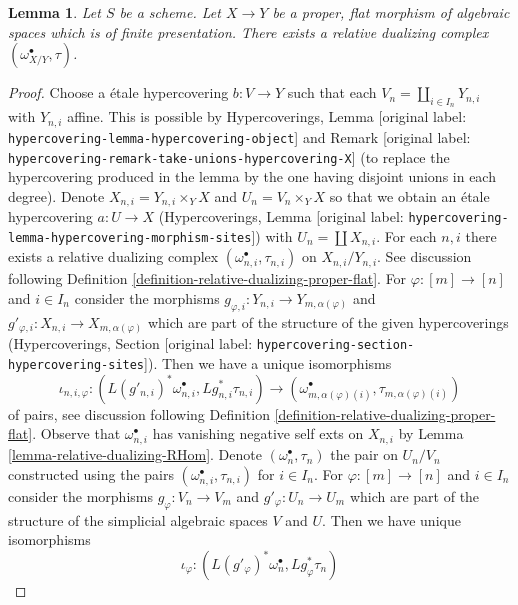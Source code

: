 \documentclass[10pt,a4paper]{article}
\theoremstyle{plain}
\newtheorem{lemma}[subsection]{Lemma}
\theoremstyle{definition}
\theoremstyle{remark}
\numberwithin{equation}{subsection}
\begin{document}
\begin{lemma}
\label{lemma-existence-relative-dualizing}
Let $S$ be a scheme. Let $X \to Y$ be a proper, flat morphism of
algebraic spaces which is of finite presentation.
There exists a relative dualizing complex $(\omega_{X/Y}^\bullet, \tau)$.
\end{lemma}

\begin{proof}
Choose a \'etale hypercovering $b : V \to Y$ such that each
$V_n = \coprod_{i \in I_n} Y_{n, i}$ with $Y_{n, i}$ affine.
This is possible by Hypercoverings, Lemma
\textnormal{[original label: \nolinkurl{hypercovering-lemma-hypercovering-object}]} and
Remark \textnormal{[original label: \nolinkurl{hypercovering-remark-take-unions-hypercovering-X}]}
(to replace the hypercovering produced
in the lemma by the one having disjoint unions in each degree).
Denote $X_{n, i} = Y_{n, i} \times_Y X$ and $U_n = V_n \times_Y X$
so that we obtain an \'etale hypercovering
$a : U \to X$ (Hypercoverings, Lemma
\textnormal{[original label: \nolinkurl{hypercovering-lemma-hypercovering-morphism-sites}]})
with $U_n = \coprod X_{n, i}$.
For each $n, i$ there exists a relative dualizing complex
$(\omega_{n, i}^\bullet, \tau_{n, i})$ on $X_{n, i}/Y_{n, i}$.
See discussion following
Definition \ref{definition-relative-dualizing-proper-flat}.
For $\varphi : [m] \to [n]$ and $i \in I_n$ consider the morphisms
$g_{\varphi, i} : Y_{n, i} \to Y_{m, \alpha(\varphi)}$ and
$g'_{\varphi, i} : X_{n, i} \to X_{m, \alpha(\varphi)}$
which are part of the structure of the given hypercoverings
(Hypercoverings, Section \textnormal{[original label: \nolinkurl{hypercovering-section-hypercovering-sites}]}).
Then we have a unique isomorphisms
$$
\iota_{n, i, \varphi} :
(L(g'_{n, i})^*\omega_{n, i}^\bullet, Lg_{n, i}^*\tau_{n, i})
\longrightarrow
(\omega_{m, \alpha(\varphi)(i)}^\bullet, \tau_{m, \alpha(\varphi)(i)})
$$
of pairs, see discussion following
Definition \ref{definition-relative-dualizing-proper-flat}.
Observe that $\omega_{n, i}^\bullet$ has vanishing negative
self exts on $X_{n, i}$ by Lemma \ref{lemma-relative-dualizing-RHom}.
Denote $(\omega_n^\bullet, \tau_n)$ the pair on $U_n/V_n$ constructed using
the pairs $(\omega_{n, i}^\bullet, \tau_{n, i})$ for $i \in I_n$.
For $\varphi : [m] \to [n]$ and $i \in I_n$ consider the morphisms
$g_\varphi : V_n \to V_m$ and $g'_\varphi : U_n \to U_m$ which are part
of the structure of the simplicial algebraic spaces $V$ and $U$.
Then we have unique isomorphisms
$$
\iota_\varphi :
(L(g'_\varphi)^*\omega_n^\bullet, Lg_\varphi^*\tau_n)
$$
\end{proof}
\end{document}
